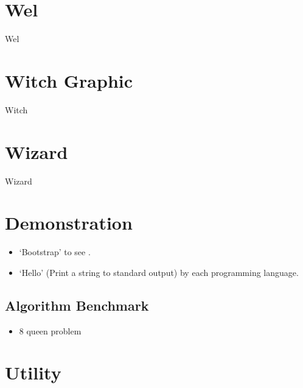 \section{Wel}

{Wel}



\section{Witch Graphic}


{Witch}



\section{Wizard}

{Wizard}



\section{Demonstration}

\begin{itemize}

\item `Bootstrap' to see .



\item `Hello' (Print a string to standard output) by each programming language.
\end{itemize}



\subsection{Algorithm Benchmark}

\begin{itemize}

\item 8 queen problem
\end{itemize}



\section{Utility}

